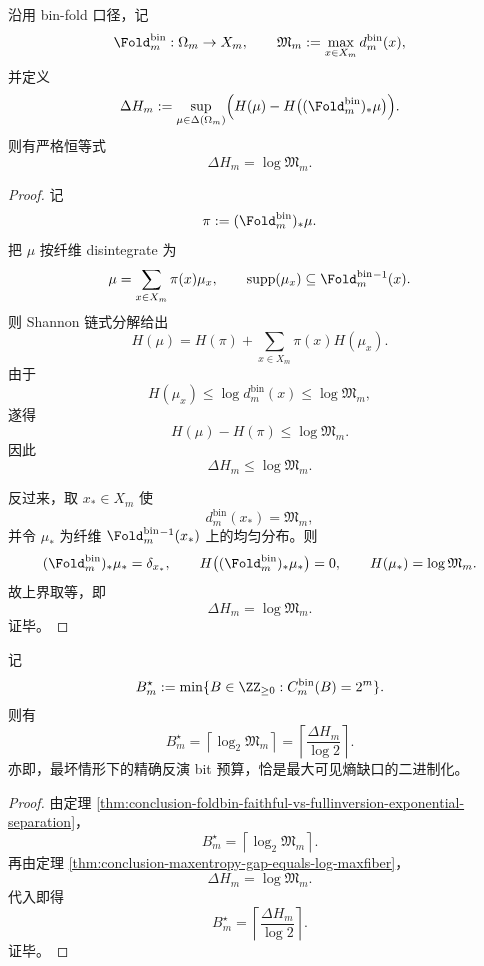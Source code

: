 \begin{theorem}[最大可见熵缺口与极大纤维的对数等值]\label{thm:conclusion-maxentropy-gap-equals-log-maxfiber}
沿用 bin-fold 口径，记
\[
\Fold_m^{\mathrm{bin}}:\Omega_m\to X_m,
\qquad
\mathfrak M_m:=\max_{x\in X_m}d_m^{\mathrm{bin}}(x),
\]
并定义
\[
\Delta H_m
:=
\sup_{\mu\in\Delta(\Omega_m)}
\Bigl(H(\mu)-H\bigl((\Fold_m^{\mathrm{bin}})_*\mu\bigr)\Bigr).
\]
则有严格恒等式
\[
\Delta H_m=\log \mathfrak M_m.
\]
\end{theorem}
\begin{proof}
记
\[
\pi:=(\Fold_m^{\mathrm{bin}})_*\mu.
\]
把 \(\mu\) 按纤维 disintegrate 为
\[
\mu=\sum_{x\in X_m}\pi(x)\mu_x,
\qquad
\operatorname{supp}(\mu_x)\subseteq \Fold_m^{\mathrm{bin}}{}^{-1}(x).
\]
则 Shannon 链式分解给出
\[
H(\mu)
=
H(\pi)+\sum_{x\in X_m}\pi(x)H(\mu_x).
\]
由于
\[
H(\mu_x)\le \log d_m^{\mathrm{bin}}(x)\le \log \mathfrak M_m,
\]
遂得
\[
H(\mu)-H(\pi)\le \log \mathfrak M_m.
\]
因此
\[
\Delta H_m\le \log \mathfrak M_m.
\]

反过来，取 \(x_\ast\in X_m\) 使
\[
d_m^{\mathrm{bin}}(x_\ast)=\mathfrak M_m,
\]
并令 \(\mu_\ast\) 为纤维 \(\Fold_m^{\mathrm{bin}}{}^{-1}(x_\ast)\) 上的均匀分布。则
\[
(\Fold_m^{\mathrm{bin}})_*\mu_\ast=\delta_{x_\ast},
\qquad
H\bigl((\Fold_m^{\mathrm{bin}})_*\mu_\ast\bigr)=0,
\qquad
H(\mu_\ast)=\log \mathfrak M_m.
\]
故上界取等，即
\[
\Delta H_m=\log \mathfrak M_m.
\]
证毕。
\end{proof}

\begin{corollary}[精确反演阈值的熵化表达]\label{cor:conclusion-full-inversion-threshold-entropy-gap}
记
\[
B_m^\star
:=
\min\{B\in\ZZ_{\ge 0}:C_m^{\mathrm{bin}}(B)=2^m\}.
\]
则有
\[
B_m^\star
=
\left\lceil \log_2\mathfrak M_m\right\rceil
=
\left\lceil \frac{\Delta H_m}{\log 2}\right\rceil.
\]
亦即，最坏情形下的精确反演 bit 预算，恰是最大可见熵缺口的二进制化。
\end{corollary}
\begin{proof}
由定理 \ref{thm:conclusion-foldbin-faithful-vs-fullinversion-exponential-separation}，
\[
B_m^\star=\left\lceil \log_2\mathfrak M_m\right\rceil.
\]
再由定理 \ref{thm:conclusion-maxentropy-gap-equals-log-maxfiber}，
\[
\Delta H_m=\log \mathfrak M_m.
\]
代入即得
\[
B_m^\star
=
\left\lceil \frac{\Delta H_m}{\log 2}\right\rceil.
\]
证毕。
\end{proof}

